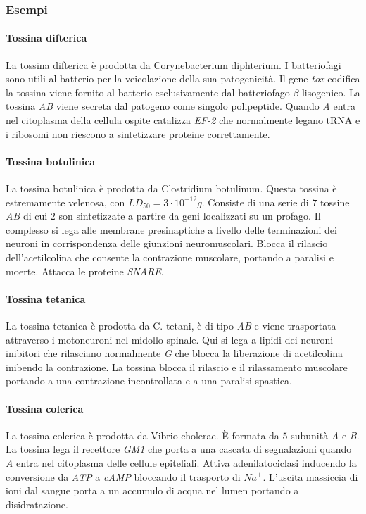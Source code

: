 		\subsubsection{Esempi}

			\paragraph{Tossina difterica}
			La tossina difterica \`e prodotta da Corynebacterium diphterium.
			I batteriofagi sono utili al batterio per la veicolazione della sua patogenicit\`a.
			Il gene \emph{tox} codifica la tossina viene fornito al batterio esclusivamente dal batteriofago $\beta$ lisogenico.
			La tossina \emph{AB} viene secreta dal patogeno come singolo polipeptide.
			Quando \emph{A} entra nel citoplasma della cellula ospite catalizza \emph{EF-2} che normalmente legano tRNA e i ribosomi non riescono a sintetizzare proteine correttamente.

			\paragraph{Tossina botulinica}
			La tossina botulinica \`e prodotta da Clostridium botulinum.
			Questa tossina \`e estremamente velenosa, con $LD_{50} = 3\cdot 10^{-12}\si{g}$.
			Consiste di una serie di $7$ tossine \emph{AB} di cui $2$ son sintetizzate a partire da geni localizzati su un profago.
			Il complesso si lega alle membrane presinaptiche a livello delle terminazioni dei neuroni in corrispondenza delle giunzioni neuromuscolari.
			Blocca il rilascio dell'acetilcolina che consente la contrazione muscolare, portando a paralisi e moerte.
			Attacca le proteine \emph{SNARE}.

			\paragraph{Tossina tetanica}
			La tossina tetanica \`e prodotta da C. tetani, \`e di tipo \emph{AB} e viene trasportata attraverso i motoneuroni nel midollo spinale.
			Qui si lega a lipidi dei neuroni inibitori che rilasciano normalmente \emph{G} che blocca la liberazione di acetilcolina inibendo la contrazione.
			La tossina blocca il rilascio e il rilassamento muscolare portando a una contrazione incontrollata e a una paralisi spastica.

			\paragraph{Tossina colerica}
			La tossina colerica \`e prodotta da Vibrio cholerae.
			\`E formata da $5$ subunit\`a \emph{A} e \emph{B}.
			La tossina lega il recettore \emph{GM1} che porta a una cascata di segnalazioni quando \emph{A} entra nel citoplasma delle cellule epiteliali.
			Attiva adenilatociclasi inducendo la conversione da \emph{ATP} a \emph{cAMP} bloccando il trasporto di \emph{$Na^+$}.
			L'uscita massiccia di ioni dal sangue porta a un accumulo di acqua nel lumen portando a disidratazione.

